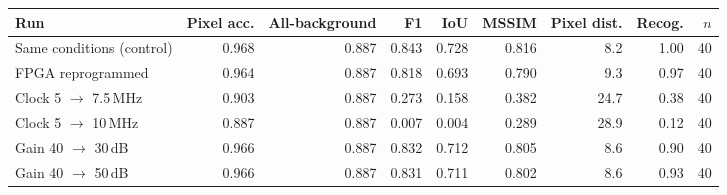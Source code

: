 \begin{tabular}{lrrrrrrrr}
\hline
Run & Pixel acc. & All-background & F1 & IoU & MSSIM & Pixel dist. & Recog. & $n$ \\
\hline
Same conditions (control) & 0.968 & 0.887 & 0.843 & 0.728 & 0.816 & 8.2 & 1.00 & 40 \\
FPGA reprogrammed & 0.964 & 0.887 & 0.818 & 0.693 & 0.790 & 9.3 & 0.97 & 40 \\
Clock 5 $\to$ 7.5\,MHz & 0.903 & 0.887 & 0.273 & 0.158 & 0.382 & 24.7 & 0.38 & 40 \\
Clock 5 $\to$ 10\,MHz & 0.887 & 0.887 & 0.007 & 0.004 & 0.289 & 28.9 & 0.12 & 40 \\
Gain 40 $\to$ 30\,dB & 0.966 & 0.887 & 0.832 & 0.712 & 0.805 & 8.6 & 0.90 & 40 \\
Gain 40 $\to$ 50\,dB & 0.966 & 0.887 & 0.831 & 0.711 & 0.802 & 8.6 & 0.93 & 40 \\
\hline
\end{tabular}

